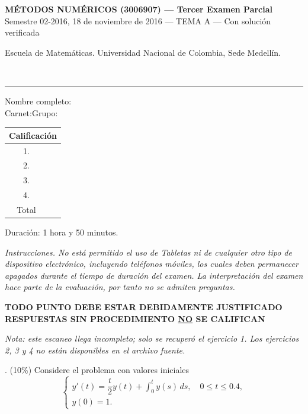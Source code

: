\documentclass[11pt]{article}
\newcommand{\examheader}{%
  \noindent
  \begin{minipage}[t]{0.6\linewidth}
    {\small\bfseries MÉTODOS NUMÉRICOS (3006907) --- Tercer Examen Parcial}\\
    {\small Semestre 02-2016, 18 de noviembre de 2016 --- TEMA A --- Con solución verificada}
  \end{minipage}%
  \hfill
  \begin{minipage}[t]{0.35\linewidth}
    \raggedleft\small Escuela de Matemáticas. Universidad Nacional de Colombia, Sede Medellín.
  \end{minipage}\\[2pt]
  \rule{\linewidth}{0.6pt}
}
\begin{document}
\examheader

\vspace{4pt}
\noindent
\begin{minipage}[t]{0.62\linewidth}
Nombre completo:\underline{\hspace{8cm}}\\[6pt]
Carnet:\underline{\hspace{5cm}}\quad Grupo:\underline{\hspace{2.5cm}}
\end{minipage}%
\hfill
\begin{minipage}[t]{0.33\linewidth}
\begin{center}
\begin{tabular}{|c|c|}
\hline
\multicolumn{2}{|c|}{Calificación} \\
\hline
1. & \\
\hline
2. & \\
\hline
3. & \\
\hline
4. & \\
\hline
Total & \\
\hline
\end{tabular}
\end{center}
\end{minipage}

\vspace{6pt}
\noindent Duración: 1 hora y 50 minutos.

\vspace{6pt}
\noindent\textit{Instrucciones. No está permitido el uso de Tabletas ni de cualquier otro tipo de dispositivo electrónico, incluyendo teléfonos móviles, los cuales deben permanecer apagados durante el tiempo de duración del examen. La interpretación del examen hace parte de la evaluación, por tanto no se admiten preguntas.}

\vspace{6pt}
\begin{center}
\textbf{TODO PUNTO DEBE ESTAR DEBIDAMENTE JUSTIFICADO}\\
\textbf{RESPUESTAS SIN PROCEDIMIENTO \underline{NO} SE CALIFICAN}
\end{center}

\vspace{10pt}
\noindent\textit{Nota: este escaneo llega incompleto; solo se recuperó el ejercicio 1. Los ejercicios 2, 3 y 4 no están disponibles en el archivo fuente.}

\vspace{10pt}

. (10\%) Considere el problema con valores iniciales
\[
\begin{cases}
y'(t) = \dfrac{t}{2}y(t) + \displaystyle\int_0^t y(s)\,ds, \quad 0 \le t \le 0.4, \\[6pt]
y(0) = 1.
\end{cases}
\]
\end{document}

